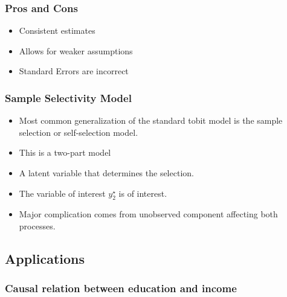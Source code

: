 \documentclass{beamer}
\newcommand{\1}{\mathbb{1}}
\begin{document}
\begin{frame}\frametitle{Pros and Cons}
\begin{itemize}
 \item Consistent estimates
 \item Allows for weaker assumptions
 \item Standard Errors are incorrect
\end{itemize}
\end{frame}

\begin{frame}\frametitle{Sample Selectivity Model}
\begin{itemize}
 \item Most common generalization of the standard tobit
model is the sample selection or self-selection model.
\item This is a two-part model
\item A latent variable that determines the selection.
\item The variable of interest $y_2^{\star}$ is of interest.
\item Major complication comes from unobserved component affecting both processes.
\end{itemize}
\end{frame}


\subsection{Applications}

\begin{frame}
\end{frame}

\subsubsection{Causal relation between education and income}

\end{document}
